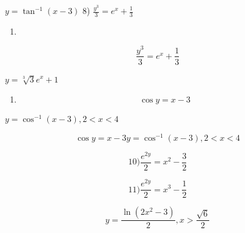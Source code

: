 \documentclass[
]{article}
\providecommand{\tightlist}{%
  \setlength{\itemsep}{0pt}\setlength{\parskip}{0pt}}
\begin{document}
\(y = \tan^{-1}(x - 3)\) 8) \(\frac{y^3}{3} = e^x + \frac{1}{3}\)

\begin{enumerate}
\def\labelenumi{\arabic{enumi})}
\setcounter{enumi}{7}
\tightlist
\item
\end{enumerate}

\[\frac{y^3}{3} = e^x + \frac{1}{3}\]

\(y = \sqrt[3]{3}e^x + 1\)

\begin{enumerate}
\def\labelenumi{\arabic{enumi})}
\setcounter{enumi}{8}
\tightlist
\item
  \[\cos y = x - 3\]
\end{enumerate}

\(y = \cos^{-1}(x - 3), 2 < x < 4\)

\[\cos y = x - 3 y = \cos^{-1}(x - 3), 2 < x < 4\]

\[10) \frac{e^{2y}}{2} = x^2 - \frac{3}{2}\]

\[11) \frac{e^{2y}}{2} = x^3 - \frac{1}{2}\]

\[y = \frac{\ln(2x^2 - 3)}{2}, x > \frac{\sqrt{6}}{2}\]
\end{document}
